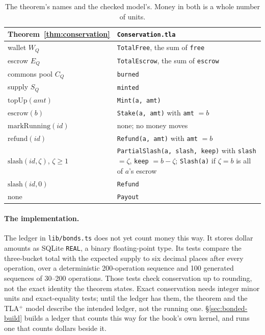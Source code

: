 \documentclass[11pt,a4paper]{article}
\theoremstyle{definition}
\theoremstyle{remark}
\begin{document}
\begin{table}[H]
\centering\small
\caption{The theorem's names and the checked model's. Money in both is a whole number of units.}
\label{tab:bonded-conservation-dictionary}
\begin{tabularx}{\linewidth}{@{}>{\raggedright\arraybackslash}p{.36\linewidth} >{\raggedright\arraybackslash}X@{}}
\toprule
\textbf{Theorem~\ref{thm:conservation}} & \textbf{\texttt{Conservation.tla}} \\
\midrule
wallet $W_Q$ & \texttt{TotalFree}, the sum of \texttt{free} \\
escrow $E_Q$ & \texttt{TotalEscrow}, the sum of \texttt{escrow} \\
commons pool $C_Q$ & \texttt{burned} \\
supply $S_Q$ & \texttt{minted} \\
$\mathrm{topUp}(\mathit{amt})$ & \texttt{Mint(a, amt)} \\
$\mathrm{escrow}(b)$ & \texttt{Stake(a, amt)} with \texttt{amt} $=b$ \\
$\mathrm{markRunning}(\mathit{id})$ & none; no money moves \\
$\mathrm{refund}(\mathit{id})$ & \texttt{Refund(a, amt)} with \texttt{amt} $=b$ \\
$\mathrm{slash}(\mathit{id},\zeta)$, $\zeta\ge1$ & \texttt{PartialSlash(a, slash, keep)} with \texttt{slash} $=\zeta$, \texttt{keep} $=b-\zeta$; \texttt{Slash(a)} if $\zeta=b$ is all of $a$'s escrow \\
$\mathrm{slash}(\mathit{id},0)$ & \texttt{Refund} \\
none & \texttt{Payout} \\
\bottomrule
\end{tabularx}
\end{table}

\paragraph{The implementation.} The ledger in \texttt{lib/bonds.ts} does not
yet count money this way. It stores dollar amounts as SQLite \texttt{REAL}, a
binary floating-point type. Its tests compare the three-bucket total with the
expected supply to six decimal places after every operation, over a
deterministic 200-operation sequence and 100 generated sequences of 30--200
operations. Those tests check conservation up to rounding, not the exact
identity the theorem states. Exact conservation needs integer minor units and
exact-equality tests; until the ledger has them, the theorem and the
TLA$^{+}$ model describe the intended ledger, not the running one.
\S\ref{sec:bonded-build} builds a ledger that counts this way for the
book's own kernel, and runs one that counts dollars beside it.
\end{document}
